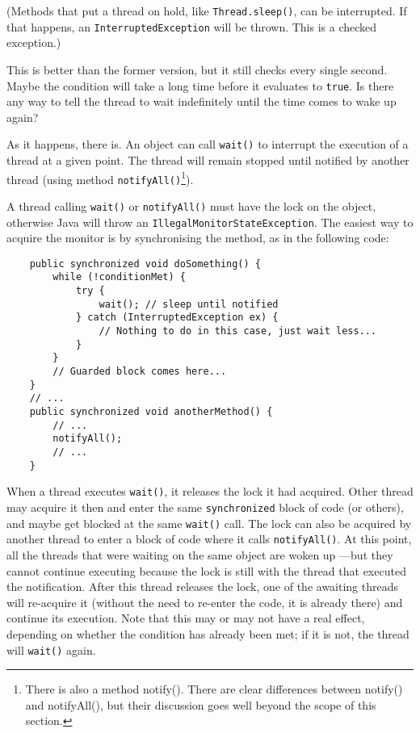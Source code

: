 (Methods that put a thread on hold, like \verb+Thread.sleep()+, can be
interrupted. If that happens, an \verb+InterruptedException+ will be
thrown. This is a checked exception.)

This is better than the former version, but it still checks every
single second. Maybe the condition will take a long time before it
evaluates to \verb+true+. Is there any way to tell the thread to wait
indefinitely until the time comes to wake up again? 

As it happens, there is. An object can call \verb+wait()+ to interrupt
the execution of a thread at a given point. The thread will remain
stopped until notified by another thread (using method
\verb+notifyAll()+\footnote{There is also a method notify(). There are
clear differences between notify() and notifyAll(), but their
discussion goes well beyond the scope of this section.}). 

A thread calling \verb+wait()+ or \verb+notifyAll()+ must have the
lock on the object, otherwise Java will throw an
\verb+IllegalMonitorStateException+. The easiest way to acquire the
monitor is by synchronising the method, as in the following code: 

\begin{verbatim}
    public synchronized void doSomething() {
        while (!conditionMet) {
            try {
                wait(); // sleep until notified
            } catch (InterruptedException ex) {
                // Nothing to do in this case, just wait less...
            }
        }  
        // Guarded block comes here...
    }
    // ...
    public synchronized void anotherMethod() {
        // ...
        notifyAll();
        // ...
    }
\end{verbatim}

When a thread executes \verb+wait()+, it releases the lock it had
acquired. Other thread may acquire it then and enter the same
\verb+synchronized+ block of code (or others), and maybe get blocked
at the same \verb+wait()+ call. The lock can also be acquired by another
thread to enter a block of code where it calls \verb+notifyAll()+. At
this point, all the threads that were waiting on the same object are
woken up ---but they cannot continue executing because the lock is
still with the thread that executed the notification. After this
thread releases the lock, one of the awaiting threads will re-acquire
it (without the need to re-enter the code, it is already there) and
continue its execution. Note that this may or may not have a real
effect, depending on whether the condition has already been met; if it
is not, the thread will \verb+wait()+ again. 

